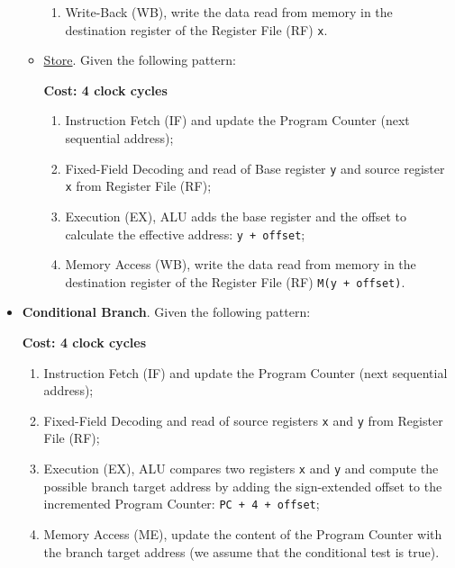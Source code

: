 \begin{itemize}
\begin{itemize}
\begin{enumerate}
            \item Write-Back (WB), write the data read from memory in the destination register of the Register File (RF) \texttt{x}.
        \end{enumerate}

        \newpage

        \item \underline{Store}. Given the following pattern:
        
        \textbf{Cost: 4 clock cycles}
        \begin{enumerate}
            \item Instruction Fetch (IF) and update the Program Counter (next sequential address);

            \item Fixed-Field Decoding and read of Base register \texttt{y} and source register \texttt{x} from Register File (RF);

            \item Execution (EX), ALU adds the base register and the offset to calculate the effective address: \texttt{y + offset};

            \item Memory Access (WB), write the data read from memory in the destination register of the Register File (RF) \texttt{M(y + offset)}.
        \end{enumerate}
    \end{itemize}

    \item \textbf{Conditional Branch}. Given the following pattern:
    
        \textbf{Cost: 4 clock cycles}
        \begin{enumerate}
            \item Instruction Fetch (IF) and update the Program Counter (next sequential address);

            \item Fixed-Field Decoding and read of source registers \texttt{x} and \texttt{y} from Register File (RF);

            \item Execution (EX), ALU compares two registers \texttt{x} and \texttt{y} and compute the possible branch target address by adding the sign-extended offset to the incremented Program Counter: \texttt{PC + 4 + offset};

            \item Memory Access (ME), update the content of the Program Counter with the branch target address (we assume that the conditional test is true).
        \end{enumerate}
\end{itemize}